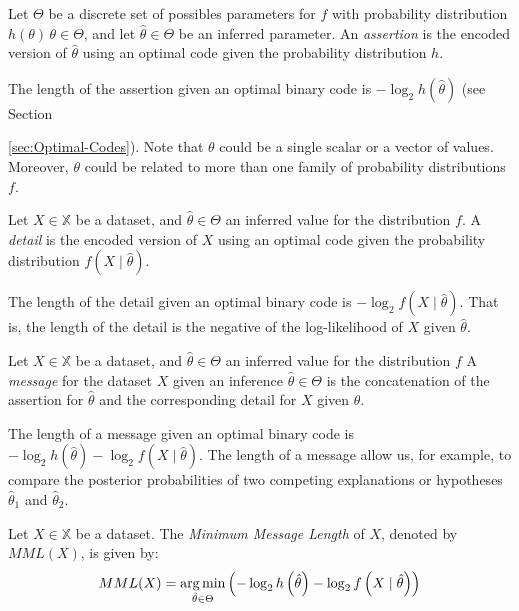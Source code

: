 \begin{definition}
    Let $\Theta$ be a discrete set of possibles parameters for $f$ with probability distribution $h(\theta) \, \theta \in \Theta$, and let $\hat\theta \in \Theta$ be an inferred parameter. An \emph{assertion} is the encoded version of $\hat\theta$ using an optimal code given the probability distribution $h$.
\end{definition}

The length of the assertion given an optimal binary code is $- \log_2 h(\hat\theta)$ (see Section {\ref{sec:Optimal-Codes}). Note that $\theta$ could be a single scalar or a vector of values. Moreover, $\theta$ could be related to more than one family of probability distributions $f$.

\begin{definition}
    Let $X \in \mathbb{X}$ be a dataset, and $\hat \theta \in \Theta$ an inferred value for the distribution $f$. A \emph{detail} is the encoded version of $X$ using an optimal code given the probability distribution $f(X \mid \hat\theta)$.
\end{definition}

The length of the detail given an optimal binary code is $- \log_2 f( X \mid \hat\theta )$. That is, the length of the detail is the negative of the log-likelihood of $X$ given $\hat\theta$.

\begin{definition}
    Let $X \in \mathbb{X}$ be a dataset, and $\hat \theta \in \Theta$ an inferred value for the distribution $f$ A \emph{message} for the dataset $X$ given an inference $\hat\theta \in \Theta$ is the concatenation of the assertion for $\hat\theta$ and the corresponding detail for $X$ given $\theta$.
\end{definition}

The length of a message given an optimal binary code is $- \log_2 h \left( \hat\theta \right) - \log_2 f \left( X \mid \hat\theta \right)$. The length of a message allow us, for example, to compare the posterior probabilities of two competing explanations or hypotheses $\hat\theta_1$ and $\hat\theta_2$.

\begin{definition}
    Let $X \in \mathbb{X}$ be a dataset. The \emph{Minimum Message Length} of $X$, denoted by $MML(X)$, is given by:
    \[
        MML(X) = \operatorname*{arg\,min}_{\hat\theta \in \Theta} \left( - \log_2 h \left( \hat\theta \right) - \log_2 f \left( X \mid \hat\theta \right) \right)
    \]


\end{definition}}
